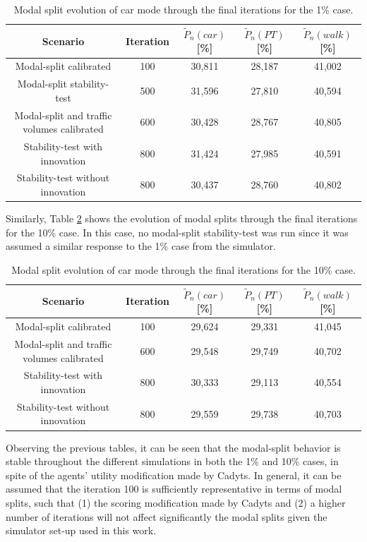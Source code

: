 \documentclass[Journal,letterpaper]{ascelike-new}
\begin{document}
\begin{table}
	\caption{Modal split evolution of car mode through the final iterations for the 1\% case.}
	\label{table:1pct_modalSplitEvolution}
	\begin{tabular}{ccccc}
		\hline	
		Scenario & Iteration & $\tilde{P}_{n}(car)$ [\%] &  $\tilde{P}_{n}(PT)$ [\%]&$\tilde{P}_{n}(walk)$ [\%] \\
		\hline
		Modal-split calibrated						& 100 & 30,811 & 28,187 & 41,002 \\
		Modal-split stability-test					& 500 & 31,596 & 27,810 & 40,594 \\
		Modal-split and traffic volumes calibrated	& 600 & 30,428 & 28,767 & 40,805 \\
		Stability-test with innovation				& 800 & 31,424 & 27,985 & 40,591 \\
		Stability-test without innovation			& 800 & 30,437 & 28,760 & 40,802 \\
		\hline
	\end{tabular}
\end{table}

Similarly, Table \ref{table:10pct_modalSplitEvolution} shows the evolution of modal splits through the final iterations for the 10\% case. In this case, no modal-split stability-test was run since it was assumed a similar response to the 1\% case from the simulator.

\begin{table}
	\caption{Modal split evolution of car mode through the final iterations for the 10\% case.}
	\label{table:10pct_modalSplitEvolution}
	\begin{tabular}{ccccc}
		\hline	
		Scenario & Iteration & $\tilde{P}_{n}(car)$ [\%] &  $\tilde{P}_{n}(PT)$ [\%]&$\tilde{P}_{n}(walk)$ [\%] \\
		\hline
		Modal-split calibrated						& 100 & 29,624 & 29,331 & 41,045 \\
		Modal-split and traffic volumes calibrated	& 600 & 29,548 & 29,749 & 40,702 \\
		Stability-test with innovation				& 800 & 30,333 & 29,113 & 40,554 \\
		Stability-test without innovation			& 800 & 29,559 & 29,738 & 40,703 \\
		\hline
	\end{tabular}
\end{table}

Observing the previous tables, it can be seen that the modal-split behavior is stable throughout the different simulations in both the 1\% and 10\% cases, in spite of the agents' utility modification made by Cadyts. In general, it can be assumed that the iteration 100 is sufficiently representative in terms of modal splits, such that (1) the scoring modification made by Cadyts and (2) a higher number of iterations will not affect significantly the modal splits given the simulator set-up used in this work. %
\end{document}
